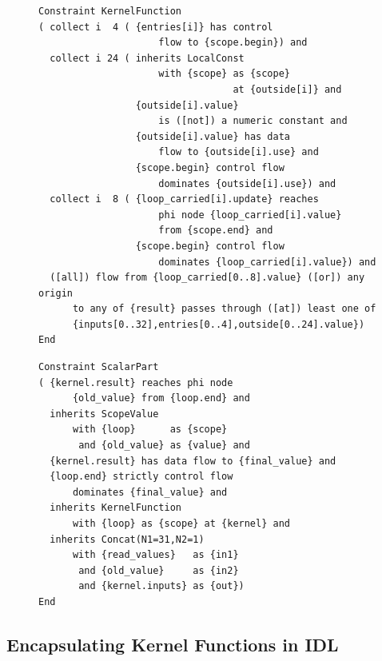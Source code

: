 \begin{figure}[p]
\begin{lstlisting}[language=IDL]
Constraint KernelFunction
( collect i  4 ( {entries[i]} has control
                     flow to {scope.begin}) and
  collect i 24 ( inherits LocalConst
                     with {scope} as {scope}
                                  at {outside[i]} and
                 {outside[i].value}
                     is ([not]) a numeric constant and
                 {outside[i].value} has data
                     flow to {outside[i].use} and
                 {scope.begin} control flow
                     dominates {outside[i].use}) and
  collect i  8 ( {loop_carried[i].update} reaches
                     phi node {loop_carried[i].value}
                     from {scope.end} and
                 {scope.begin} control flow
                     dominates {loop_carried[i].value}) and
  ([all]) flow from {loop_carried[0..8].value} ([or]) any origin
      to any of {result} passes through ([at]) least one of
      {inputs[0..32],entries[0..4],outside[0..24].value})
End
\end{lstlisting}
\begin{lstlisting}[language=IDL,label={IDLscalarPart},caption=
   {IDL specification of a scalar reduction within a complex reduction and
    histogram computation:
    The kernel function operates within a loop.
    Its input \texttt{kernel.inputs} is composed of \texttt{read\_values} and
    the reduction value of the previous iteration, concatenated with
    \texttt{Concat}.}]
Constraint ScalarPart
( {kernel.result} reaches phi node
      {old_value} from {loop.end} and
  inherits ScopeValue
      with {loop}      as {scope}
       and {old_value} as {value} and 
  {kernel.result} has data flow to {final_value} and
  {loop.end} strictly control flow
      dominates {final_value} and
  inherits KernelFunction
      with {loop} as {scope} at {kernel} and
  inherits Concat(N1=31,N2=1)
      with {read_values}   as {in1}
       and {old_value}     as {in2}
       and {kernel.inputs} as {out})
End
\end{lstlisting}
\end{figure}

\subsection{Encapsulating Kernel Functions in IDL}
\label{sec:IDLkernels}

